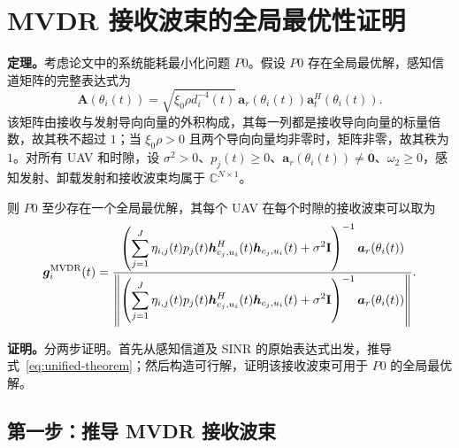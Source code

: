 \documentclass[11pt,a4paper]{ctexart}
\begin{document}
\section{MVDR 接收波束的全局最优性证明}

\noindent\textbf{定理。}考虑论文中的系统能耗最小化问题 $P0$。假设 $P0$ 存在全局最优解，感知信道矩阵的完整表达式为
\begin{equation}\label{eq:theorem-channel}
\mathbf A(\theta_i(t))=\sqrt{\xi_0\rho d_i^{-4}(t)}\,
\bm a_r(\theta_i(t))\bm a_t^H(\theta_i(t)).
\end{equation}
该矩阵由接收与发射导向向量的外积构成，其每一列都是接收导向向量的标量倍数，故其秩不超过 $1$；当 $\xi_0\rho>0$ 且两个导向向量均非零时，矩阵非零，故其秩为 $1$。对所有 UAV 和时隙，设 $\sigma^2>0$、$p_j(t)\ge0$、$\bm a_r(\theta_i(t))\ne\bm0$、$\omega_2\ge0$，感知发射、卸载发射和接收波束均属于 $\mathbb C^{N\times1}$。

则 $P0$ 至少存在一个全局最优解，其每个 UAV 在每个时隙的接收波束可以取为
\begin{equation}\label{eq:unified-theorem}
\bm g_i^{\rm MVDR}(t)=
\frac{\left(\displaystyle\sum_{j=1}^J\eta_{i,j}(t)p_j(t)
\bm h_{c_j,u_i}^{H}(t)\bm h_{c_j,u_i}(t)+\sigma^2\mathbf I\right)^{-1}
\bm a_r(\theta_i(t))}
{\left\|\left(\displaystyle\sum_{j=1}^J\eta_{i,j}(t)p_j(t)
\bm h_{c_j,u_i}^{H}(t)\bm h_{c_j,u_i}(t)+\sigma^2\mathbf I\right)^{-1}
\bm a_r(\theta_i(t))\right\|}.
\end{equation}

\medskip
\noindent\textbf{证明。}分两步证明。首先从感知信道及 SINR 的原始表达式出发，推导式~\eqref{eq:unified-theorem}；然后构造可行解，证明该接收波束可用于 $P0$ 的全局最优解。

\subsection{第一步：推导 MVDR 接收波束}
\end{document}
